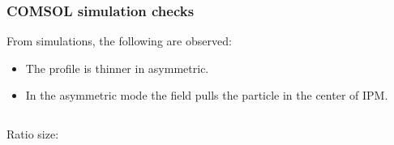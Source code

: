 \begin{frame}[t]
  \frametitle{COMSOL simulation checks}
  \begin{block}{From simulations, the following are observed:}
    \begin{itemize}
      \item The profile is thinner in asymmetric.
      \item In the asymmetric mode the field pulls the particle in the center of IPM.
    \end{itemize}
  \end{block}
  \begin{columns}[T]
    \begin{column}{0.45\textwidth}
      Ratio size:
      \centering
\end{column}
\end{columns}
\end{frame}
